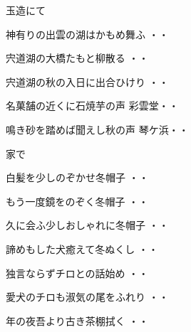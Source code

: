 \vspace{0.6cm}
玉造にて
\begin{shiika}神有りの出雲の湖はかもめ舞ふ
\hfill{・・}\end{shiika}
\begin{shiika}宍道湖の大橋たもと柳散る
\hfill{・・}\end{shiika}
\begin{shiika}宍道湖の秋の入日に出合ひけり
\hfill{・・}\end{shiika}
\begin{shiika}名菓舗の近くに石焼芋の声
彩雲堂\hfill{・・}\end{shiika}
\begin{shiika}鳴き砂を踏めば聞えし秋の声
琴ケ浜\hfill{・・}\end{shiika}
\vspace{0.6cm}
家で
\begin{shiika}白髪を少しのぞかせ冬帽子
\hfill{・・}\end{shiika}
\vspace{0.6cm}
\begin{shiika}もう一度鏡をのぞく冬帽子
\hfill{・・}\end{shiika}
\vspace{0.6cm}
\begin{shiika}久に会ふ少しおしゃれに冬帽子
\hfill{・・}\end{shiika}
\vspace{0.6cm}
\begin{shiika}諦めもした犬癒えて冬ぬくし
\hfill{・・}\end{shiika}
\vspace{0.6cm}
\begin{shiika}独言ならずチロとの話始め
\hfill{・・}\end{shiika}
\vspace{0.6cm}
\begin{shiika}愛犬のチロも淑気の尾をふれり
\hfill{・・}\end{shiika}
\vspace{0.6cm}
\begin{shiika}年の夜吾より古き茶棚拭く
\hfill{・・}\end{shiika}
